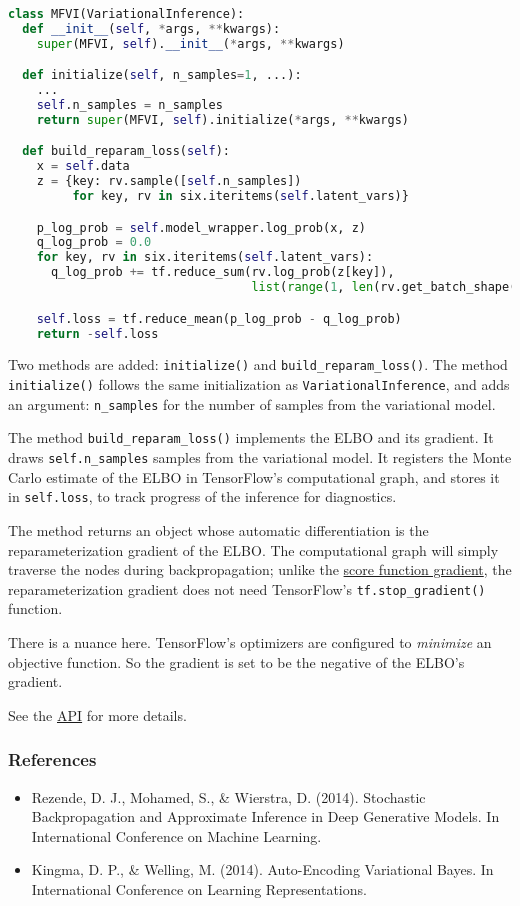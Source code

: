 \begin{lstlisting}[language=Python]
class MFVI(VariationalInference):
  def __init__(self, *args, **kwargs):
    super(MFVI, self).__init__(*args, **kwargs)

  def initialize(self, n_samples=1, ...):
    ...
    self.n_samples = n_samples
    return super(MFVI, self).initialize(*args, **kwargs)

  def build_reparam_loss(self):
    x = self.data
    z = {key: rv.sample([self.n_samples])
         for key, rv in six.iteritems(self.latent_vars)}

    p_log_prob = self.model_wrapper.log_prob(x, z)
    q_log_prob = 0.0
    for key, rv in six.iteritems(self.latent_vars):
      q_log_prob += tf.reduce_sum(rv.log_prob(z[key]),
                                  list(range(1, len(rv.get_batch_shape()) + 1)))

    self.loss = tf.reduce_mean(p_log_prob - q_log_prob)
    return -self.loss
\end{lstlisting}

Two methods are added: \texttt{initialize()} and
\texttt{build_reparam_loss()}. The method \texttt{initialize()}
follows the same initialization as \texttt{VariationalInference}, and
adds an argument: \texttt{n_samples} for the number of samples from
the variational model.

The method \texttt{build_reparam_loss()} implements the ELBO and its
gradient. It draws \texttt{self.n_samples} samples from the
variational model. It registers the Monte Carlo
estimate of the ELBO in TensorFlow's computational graph, and stores it
in \texttt{self.loss}, to track progress of the inference for diagnostics.

The method returns an object whose automatic differentiation is the
reparameterization gradient of the ELBO. The computational graph will
simply traverse the nodes during backpropagation; unlike the
\href{tut_KLqp_score}{score function gradient}, the
reparameterization gradient does not need TensorFlow's
\texttt{tf.stop_gradient()} function.

There is a nuance here. TensorFlow's optimizers are configured to
\emph{minimize} an objective function. So the gradient is set to be
the negative of the ELBO's gradient.

See the \href{api/}{API} for more details.

\subsubsection{References}\label{references}

\begin{itemize}
\item
  Rezende, D. J., Mohamed, S., & Wierstra, D. (2014). Stochastic
  Backpropagation and Approximate Inference in Deep Generative Models.
  In International Conference on Machine Learning.
\item
  Kingma, D. P., & Welling, M. (2014). Auto-Encoding Variational
  Bayes. In International Conference on Learning Representations.
\end{itemize}
